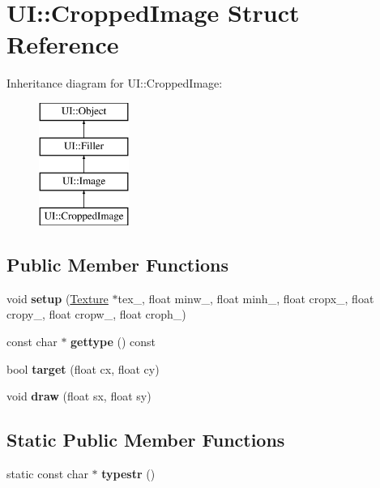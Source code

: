 \hypertarget{struct_u_i_1_1_cropped_image}{}\section{UI\+:\+:Cropped\+Image Struct Reference}
\label{struct_u_i_1_1_cropped_image}
Inheritance diagram for UI\+:\+:Cropped\+Image\+:\begin{figure}[H]
\begin{center}
\leavevmode
\includegraphics[height=4.000000cm]{struct_u_i_1_1_cropped_image}
\end{center}
\end{figure}
\subsection*{Public Member Functions}
\begin{DoxyCompactItemize}
\item 
\mbox{\label{struct_u_i_1_1_cropped_image_a61b066fde1da2cc5e8b07c649062bb50}} 
void {\bfseries setup} (\hyperlink{struct_texture}{Texture} $\ast$tex\+\_\+, float minw\+\_, float minh\+\_, float cropx\+\_, float cropy\+\_, float cropw\+\_, float croph\+\_)
\item 
\mbox{\label{struct_u_i_1_1_cropped_image_afae078dd3aae2f02aefd0d1d0104d535}} 
const char $\ast$ {\bfseries gettype} () const
\item 
\mbox{\label{struct_u_i_1_1_cropped_image_a3b5fce6f7cd8b1cbe81097f969b508cb}} 
bool {\bfseries target} (float cx, float cy)
\item 
\mbox{\label{struct_u_i_1_1_cropped_image_a45f3158330fe19f463b0d82815c8604e}} 
void {\bfseries draw} (float sx, float sy)
\end{DoxyCompactItemize}
\subsection*{Static Public Member Functions}
\begin{DoxyCompactItemize}
\item 
\mbox{\label{struct_u_i_1_1_cropped_image_a3512429c7606eaa52f9bf37e86477468}} 
static const char $\ast$ {\bfseries typestr} ()
\end{DoxyCompactItemize}
